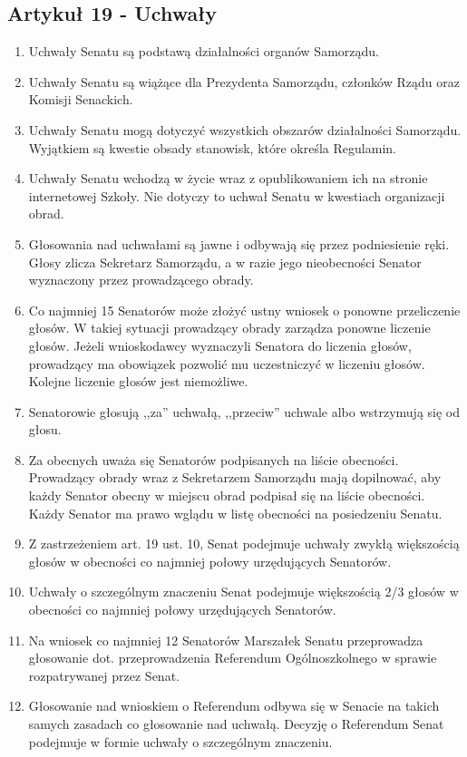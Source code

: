 \documentclass[14pt]{article}
\newenvironment{ustepy}{%
	\begin{enumerate}[leftmargin=1.5em, itemindent=1pt, labelwidth=1em, itemsep=5pt]
	}{%
	\end{enumerate}
}
\begin{document}
\subsection*{Artykuł 19 - Uchwały}
\begin{ustepy}
	\item Uchwały Senatu są podstawą działalności organów Samorządu.
	\item Uchwały Senatu są wiążące dla Prezydenta Samorządu, członków Rządu oraz Komisji Senackich.
	\item Uchwały Senatu mogą dotyczyć wszystkich obszarów działalności Samorządu. Wyjątkiem są kwestie obsady stanowisk, które określa Regulamin.
	\item Uchwały Senatu wchodzą w życie wraz z opublikowaniem ich na stronie internetowej Szkoły. Nie dotyczy to uchwał Senatu w kwestiach organizacji obrad.
	\item Głosowania nad uchwałami są jawne i odbywają się przez podniesienie ręki. Głosy zlicza Sekretarz Samorządu, a w razie jego nieobecności Senator wyznaczony przez prowadzącego obrady.
	\item Co najmniej 15 Senatorów może złożyć ustny wniosek o ponowne przeliczenie głosów. W takiej sytuacji prowadzący obrady zarządza ponowne liczenie głosów. Jeżeli wnioskodawcy wyznaczyli Senatora do liczenia głosów, prowadzący ma obowiązek pozwolić mu uczestniczyć w liczeniu głosów. Kolejne liczenie głosów jest niemożliwe. 
	\item Senatorowie głosują ,,za'' uchwałą, ,,przeciw'' uchwale albo wstrzymują się od głosu. 
	\item Za obecnych uważa się Senatorów podpisanych na liście obecności. Prowadzący obrady wraz z Sekretarzem Samorządu mają dopilnować, aby każdy Senator obecny w miejscu obrad podpisał się na liście obecności. Każdy Senator ma prawo wglądu w listę obecności na posiedzeniu Senatu.
	\item Z zastrzeżeniem art. 19 ust. 10, Senat podejmuje uchwały zwykłą większością głosów w obecności co najmniej połowy urzędujących Senatorów.
	\item Uchwały o szczególnym znaczeniu Senat podejmuje większością 2/3 głosów w obecności co najmniej połowy urzędujących Senatorów. 
	\item Na wniosek co najmniej 12 Senatorów Marszałek Senatu przeprowadza głosowanie dot. przeprowadzenia Referendum Ogólnoszkolnego w sprawie rozpatrywanej przez Senat.
	\item Głosowanie nad wnioskiem o Referendum odbywa się w Senacie na takich samych zasadach co głosowanie nad uchwałą. Decyzję o Referendum Senat podejmuje w formie uchwały o szczególnym znaczeniu.

\end{ustepy}
\end{document}
